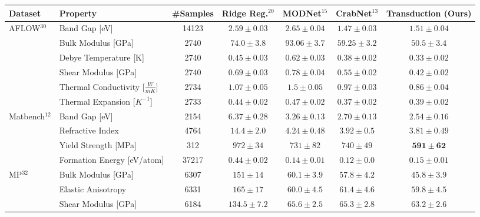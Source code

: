 \documentclass[10pt]{article}
\begin{document}
\vspace{6pt}
\renewcommand{\arraystretch}{1.2}
\setlength{\tabcolsep}{5pt}
\begin{tabularx}{\textwidth}{|l|l|c|c|c|c|c|}
\hline
\textbf{Dataset} & \textbf{Property} & \textbf{\#Samples} & \textbf{Ridge Reg.$^{20}$} & \textbf{MODNet$^{15}$} & \textbf{CrabNet$^{13}$} & \textbf{Transduction (Ours)} \\
\hline
AFLOW$^{30}$ & Band Gap [eV] & 14123 & $2.59 \pm 0.03$ & $2.65 \pm 0.04$ & $\mathbf{1.47 \pm 0.03}$ & $1.51 \pm 0.04$ \\
\cline{2-7}
 & Bulk Modulus [GPa] & 2740 & $74.0 \pm 3.8$ & $93.06 \pm 3.7$ & $59.25 \pm 3.2$ & $\mathbf{50.5 \pm 3.4}$ \\
\cline{2-7}
 & Debye Temperature [K] & 2740 & $0.45 \pm 0.03$ & $0.62 \pm 0.03$ & $0.38 \pm 0.02$ & $\mathbf{0.33 \pm 0.02}$ \\
\cline{2-7}
 & Shear Modulus [GPa] & 2740 & $0.69 \pm 0.03$ & $0.78 \pm 0.04$ & $0.55 \pm 0.02$ & $\mathbf{0.42 \pm 0.02}$ \\
\cline{2-7}
 & Thermal Conductivity [$\frac{W}{mK}$] & 2734 & $1.07 \pm 0.05$ & $1.5 \pm 0.05$ & $0.97 \pm 0.03$ & $\mathbf{0.86 \pm 0.04}$ \\
\cline{2-7}
 & Thermal Expansion [$K^{-1}$] & 2733 & $0.44 \pm 0.02$ & $0.47 \pm 0.02$ & $\mathbf{0.37 \pm 0.02}$ & $0.39 \pm 0.02$ \\
\hline
Matbench$^{12}$ & Band Gap [eV] & 2154 & $6.37 \pm 0.28$ & $3.26 \pm 0.13$ & $2.70 \pm 0.13$ & $\mathbf{2.54 \pm 0.16}$ \\
\cline{2-7}
 & Refractive Index & 4764 & $14.4 \pm 2.0$ & $4.24 \pm 0.48$ & $3.92 \pm 0.5$ & $\mathbf{3.81 \pm 0.49}$ \\
\cline{2-7}
 & Yield Strength [MPa] & 312 & $972 \pm 34$ & $731 \pm 82$ & $740 \pm 49$ & $\mathbf{591 \pm 62}$ \\
\cline{2-7}
 & Formation Energy [eV/atom] & 37217 & $0.44 \pm 0.02$ & $0.14 \pm 0.01$ & $\mathbf{0.12 \pm 0.0}$ & $0.15 \pm 0.01$ \\
\hline
MP$^{32}$ & Bulk Modulus [GPa] & 6307 & $151 \pm 14$ & $60.1 \pm 3.9$ & $57.8 \pm 4.2$ & $\mathbf{45.8 \pm 3.9}$ \\
\cline{2-7}
 & Elastic Anisotropy & 6331 & $165 \pm 17$ & $60.0 \pm 4.5$ & $61.4 \pm 4.6$ & $\mathbf{59.8 \pm 4.5}$ \\
\cline{2-7}
 & Shear Modulus [GPa] & 6184 & $134.5 \pm 7.2$ & $65.6 \pm 2.5$ & $65.3 \pm 2.8$ & $\mathbf{63.2 \pm 2.6}$ \\
\hline
\end{tabularx}
\end{document}
